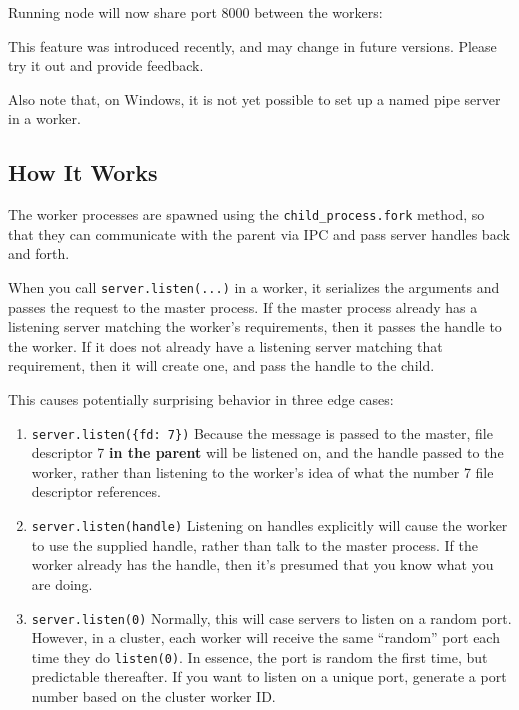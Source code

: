 Running node will now share port 8000 between the workers:

\begin{Shaded}
\end{Shaded}

This feature was introduced recently, and may change in future versions.
Please try it out and provide feedback.

Also note that, on Windows, it is not yet possible to set up a named
pipe server in a worker.

\subsection{How It Works}

The worker processes are spawned using the \texttt{child\_process.fork}
method, so that they can communicate with the parent via IPC and pass
server handles back and forth.

When you call \texttt{server.listen(...)} in a worker, it serializes the
arguments and passes the request to the master process. If the master
process already has a listening server matching the worker's
requirements, then it passes the handle to the worker. If it does not
already have a listening server matching that requirement, then it will
create one, and pass the handle to the child.

This causes potentially surprising behavior in three edge cases:

\begin{enumerate}
\item
  \texttt{server.listen(\{fd: 7\})} Because the message is passed to the
  master, file descriptor 7 \textbf{in the parent} will be listened on,
  and the handle passed to the worker, rather than listening to the
  worker's idea of what the number 7 file descriptor references.
\item
  \texttt{server.listen(handle)} Listening on handles explicitly will
  cause the worker to use the supplied handle, rather than talk to the
  master process. If the worker already has the handle, then it's
  presumed that you know what you are doing.
\item
  \texttt{server.listen(0)} Normally, this will case servers to listen
  on a random port. However, in a cluster, each worker will receive the
  same ``random'' port each time they do \texttt{listen(0)}. In essence,
  the port is random the first time, but predictable thereafter. If you
  want to listen on a unique port, generate a port number based on the
  cluster worker ID.
\end{enumerate}

